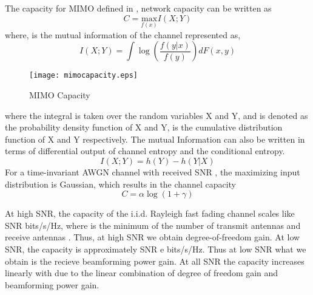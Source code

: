 The capacity for \ac{MIMO} defined in \cite{weingarten2004capacity}, network capacity can be written as
\begin{equation}
C = \underset{f(x)}{\text{max}} I(X;Y) 
\label{bgmimo2_eqn}
\end{equation} 
where,  is the mutual information of the channel represented as,
\begin{equation}
I(X;Y) = \int \log (\dfrac{f(y|x)}{f(y)}) dF(x,y)
\label{bgmimo3_eqn}
\end{equation}
\begin{figure}[h]
	\begin{center}
		\texttt{[image: mimocapacity.eps]}
		\caption{MIMO Capacity}
	\end{center}
\end{figure}
where the integral is taken over the random variables X and Y,  and  is denoted as the probability density function of X and Y,  is the cumulative distribution function of X and Y respectively. The mutual Information can also be written in terms of differential output of channel entropy and the conditional entropy. 
\begin{equation}
I(X;Y) = h(Y) - h(Y|X)
\label{bgmimo4_eqn}
\end{equation}
For a time-invariant \ac{AWGN} channel with received \ac{SNR} \me{\gamma}, the maximizing input distribution is Gaussian, which results in the channel capacity	
\begin{equation}
C = \alpha \log (1 + \gamma)
\label{bgmimo5_eqn}
\end{equation}

At high \ac{SNR}, the capacity of the i.i.d. Rayleigh fast fading channel scales like  SNR bits/s/Hz, where  is the minimum of the number of transmit antennas  and receive antennas . Thus, at high \ac{SNR} we obtain degree-of-freedom gain. At low \ac{SNR}, the capacity is approximately  SNR e bits/s/Hz. Thus at low \ac{SNR} what we obtain is the recieve beamforming power gain. At all \ac{SNR} the capacity increases linearly with  due to the linear combination of degree of freedom gain and beamforming power gain.


